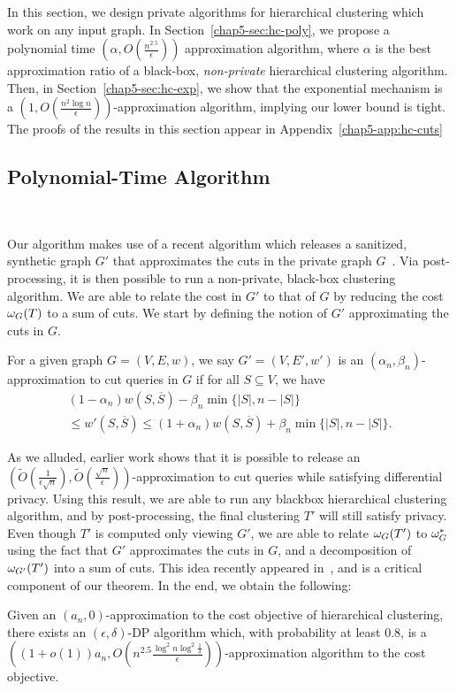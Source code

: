 In this section, we design private algorithms for hierarchical clustering which work on any input graph. In Section~\ref{chap5-sec:hc-poly}, we propose a polynomial time $(\alpha, O(\frac{n^{2.5}}{\epsilon}))$ approximation algorithm, where $\alpha$ is the best approximation ratio of a black-box, \emph{non-private} hierarchical clustering algorithm. Then, in Section~\ref{chap5-sec:hc-exp}, we show that the exponential mechanism is a $(1, O(\frac{n^{2} \log n}{\epsilon}))$-approximation algorithm, implying our lower bound is tight. The proofs of the results in this section appear in Appendix~\ref{chap5-app:hc-cuts}

\subsection{Polynomial-Time Algorithm}~\label{chap5-sec:hc-poly}

Our algorithm makes use of a recent algorithm which releases a sanitized, synthetic graph $G'$ that approximates the cuts in the private graph $G$~\citep{eliavs2020differentially,arora2019differentially}. Via post-processing, it is then possible to run a non-private, black-box clustering algorithm. We are able to relate the cost in $G'$ to that of $G$ by reducing the cost $\omega_G(T)$ to a sum of cuts. We start by defining the notion of $G'$ approximating the cuts in $G$.
\begin{defn}\label{chap5-def:cut-approx}
    For a given graph $G = (V, E, w)$, we say $G' = (V, E', w')$ is an $(\alpha_n, \beta_n)$-approximation to cut queries in $G$ if for all $S \subseteq V$, we have
    \begin{multline*}
        (1-\alpha_n) w(S, \overline{S}) - \beta_n \min \{|S|, n - |S|\} \\ \leq w'(S, \overline{S}) \leq (1+\alpha_n) w(S, \overline{S}) + \beta_n \min \{|S|, n - |S|\}.
    \end{multline*}
\end{defn}

As we alluded, earlier work shows that it is possible to release an $(\tilde{O}(\frac{1}{\epsilon\sqrt{n}}), \tilde{O}(\frac{\sqrt{n}}{\epsilon}))$-approximation to cut queries while satisfying differential privacy. Using this result, we are able to run any blackbox hierarchical clustering algorithm, and by post-processing, the final clustering $T'$ will still satisfy privacy. Even though $T'$ is computed only viewing $G'$, we are able to relate $\omega_{G}(T')$ to $\omega_G^*$ using the fact that $G'$ approximates the cuts in $G$, and a decomposition of $\omega_{G'}(T')$ into a sum of cuts. This idea recently appeared in~\citet{agarwal2022sublinear}, and is a critical component of our theorem. In the end, we obtain the following:
\begin{thm}
Given an $(a_n, 0)$-approximation to the cost objective of hierarchical clustering, 
there exists an $(\epsilon, \delta)$-DP algorithm which, with probability at least $0.8$, is a  $((1+o(1))a_n, O(n^{2.5} \frac{ \log^2 n \log^2 \frac{1}{\delta}}{\epsilon}))$-approximation algorithm to the cost objective.
\end{thm}

